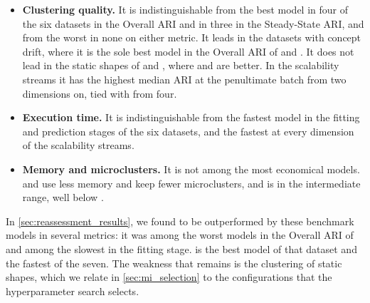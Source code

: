 \begin{itemize}
    \item \textbf{Clustering quality.} It is indistinguishable from the best model in four of the six datasets in the Overall ARI and in three in the Steady-State ARI, and from the worst in none on either metric. It leads in the datasets with concept drift, where it is the sole best model in the Overall ARI of \BenchmarkOne and \BenchmarkTwo. It does not lead in the static shapes of \ChameleonDSThree and \Cassini, where \CluStream and \StreamKM are better. In the scalability streams it has the highest median ARI at the penultimate batch from two dimensions on, tied with \CEDAS from four.
    \item \textbf{Execution time.} It is indistinguishable from the fastest model in the fitting and prediction stages of the six datasets, and the fastest at every dimension of the scalability streams.
    \item \textbf{Memory and microclusters.} It is not among the most economical models. \CEDAS and \TEDACloud use less memory and keep fewer microclusters, and \MicroTEDAClusPlus is in the intermediate range, well below \CluStream.
\end{itemize}

In \cref{sec:reassessment_results}, we found \MicroTEDAClus to be outperformed by these benchmark models in several metrics: it was among the worst models in the Overall ARI of \BenchmarkOne and among the slowest in the fitting stage. \MicroTEDAClusPlus is the best model of that dataset and the fastest of the seven. The weakness that remains is the clustering of static shapes, which we relate in \cref{sec:mi_selection} to the configurations that the hyperparameter search selects.

\clearpage
